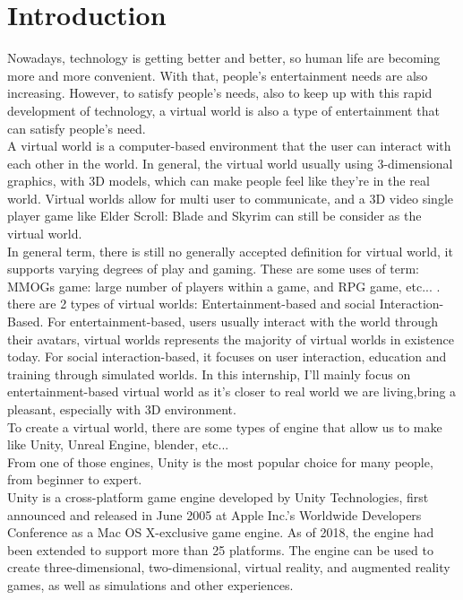 \documentclass[a4paper, 13pt]{extarticle}
\begin{document}
\newpage
\section{\Large Introduction} 
Nowadays, technology is getting better and better, so human life are becoming more and more convenient. With that, people's entertainment needs are also increasing. However, to satisfy people's needs, also to keep up with this rapid development of technology, a virtual world is also a type of entertainment that can satisfy people's need. \\[0.35cm]  A virtual world is a computer-based environment that the user can interact with each other in the world. In general, the virtual world usually using 3-dimensional graphics, with 3D models, which can make people feel like they're in the real world. Virtual worlds allow for multi user to communicate, and a 3D video single player game like Elder Scroll: Blade and Skyrim can still be consider as the virtual world. \\[0.35cm] In general term, there is still no generally accepted definition for virtual world, it supports varying degrees of play and gaming. These are some uses of term: MMOGs game: large number of players within a game, and RPG game, etc... . there are 2 types of virtual worlds: Entertainment-based and social Interaction-Based. For entertainment-based, users usually interact with the world through their avatars, virtual worlds represents the majority of virtual worlds in existence today. For social interaction-based, it focuses on user interaction, education and training through simulated worlds. In this internship, I'll mainly focus on entertainment-based virtual world as it's closer to real world we are living,bring a pleasant, especially with 3D environment. \\[0.35cm] To create a virtual world, there are some types of engine that allow us to make like Unity, Unreal Engine, blender, etc... \\[0.35cm] From one of those engines, Unity is the most popular choice for many people, from beginner to expert. \\[0.35cm] Unity is a cross-platform game engine developed by Unity Technologies, first announced and released in June 2005 at Apple Inc.'s Worldwide Developers Conference as a Mac OS X-exclusive game engine. As of 2018, the engine had been extended to support more than 25 platforms. The engine can be used to create three-dimensional, two-dimensional, virtual reality, and augmented reality games, as well as simulations and other experiences. \\[0.35cm]
\end{document}
